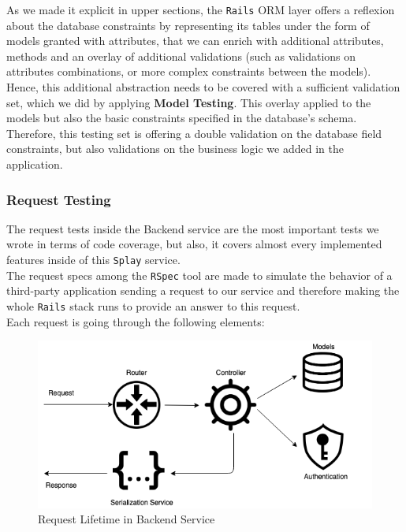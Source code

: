 \documentclass{eplmastersthesis}
\begin{document}
          As we made it explicit in upper sections, the \texttt{Rails} ORM layer offers
          a reflexion about the database constraints by representing its
          tables under the form of models granted with attributes, that we can
          enrich with additional attributes, methods and an overlay of
          additional validations (such as validations on attributes
          combinations, or more complex constraints between the models).\\

          Hence, this additional abstraction needs to be covered with a
          sufficient validation set, which we did by applying
          \textbf{Model Testing}. This overlay applied to the
          models but also the basic constraints specified in the database's
          schema.\\

          Therefore, this testing set is offering a double validation on the
          database field constraints, but also validations on the business
          logic we added in the application.

        \subsubsection{Request Testing}

          The request tests inside the Backend service are the most important
          tests we wrote in terms of code coverage, but also, it covers almost
          every implemented features inside of this \texttt{Splay} service.\\

          The request specs among the \texttt{RSpec} tool are made to simulate
          the behavior of a third-party application sending a request to
          our service and therefore making the whole \texttt{Rails} stack runs
          to provide an answer to this request.\\
          Each request is going through the following elements:

          \begin{figure}[H]
            \centering
            \includegraphics[scale=0.6]{figures/request_test.png}
            \caption{\label{request_test} Request Lifetime in Backend Service}
          \end{figure}
\end{document}
